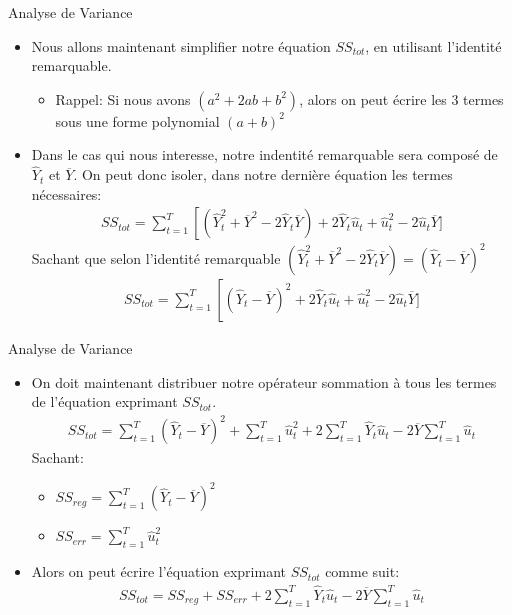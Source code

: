 \documentclass{beamer}
\begin{document}
\begin{frame}{Analyse de Variance}
\begin{itemize}
\item Nous allons maintenant simplifier notre équation $SS_{tot}$, en utilisant l'identité remarquable. 
\begin{itemize}
\item Rappel: Si nous avons $(a^2+2ab+b^2)$, alors on peut écrire les 3 termes sous une forme polynomial $(a+b)^2$
\end{itemize}
\item Dans le cas qui nous interesse, notre indentité remarquable sera composé de $\hat{Y}_t$ et $\overline{Y}$. On peut donc isoler, dans notre dernière équation les termes nécessaires:
\begin{align*}
SS_{tot} =\sum_{t=1}^{T} \left[(\hat{Y}_t^2+\overline{Y}^2-2\hat{Y}_t \overline{Y})+2\hat{Y}_t\hat{u}_t + \hat{u}_t^2-2 \hat{u}_t \overline{Y}]
\end{align*}
Sachant que selon l'identité remarquable $(\hat{Y}_t^2+\overline{Y}^2-2\hat{Y}_t \overline{Y})=(\hat{Y}_t-\overline{Y})^2$
\begin{align*}
SS_{tot} =\sum_{t=1}^{T} \left[(\hat{Y}_t-\overline{Y})^2+2\hat{Y}_t\hat{u}_t + \hat{u}_t^2-2 \hat{u}_t \overline{Y}]
\end{align*}
\end{itemize}

 \end{frame}


\begin{frame}{Analyse de Variance}
\begin{itemize}
\item On doit maintenant distribuer notre opérateur sommation à tous les termes de l'équation exprimant $SS_{tot}$.
\begin{align*}
SS_{tot}=\sum_{t=1}^{T} (\hat{Y}_t-\overline{Y})^2 + \sum_{t=1}^{T} \hat{u}_t^2 +2\sum_{t=1}^{T}\hat{Y}_t\hat{u}_t  -2 \overline{Y}\sum_{t=1}^{T}\hat{u}_t
\end{align*}
Sachant:
\begin{itemize}
\item $SS_{reg}=\sum_{t=1}^{T}(\hat{Y}_t-\overline{Y})^2$
\item $SS_{err}=\sum_{t=1}^{T} \hat{u}_t^2$
\end{itemize}
\item Alors on peut écrire l'équation exprimant $SS_{tot}$ comme suit:
\begin{align*}
SS_{tot}=SS_{reg} + SS_{err} +2\sum_{t=1}^{T}\hat{Y}_t\hat{u}_t  -2 \overline{Y}\sum_{t=1}^{T}\hat{u}_t
\end{align*}
\end{itemize}

\end{frame}
\end{document}
